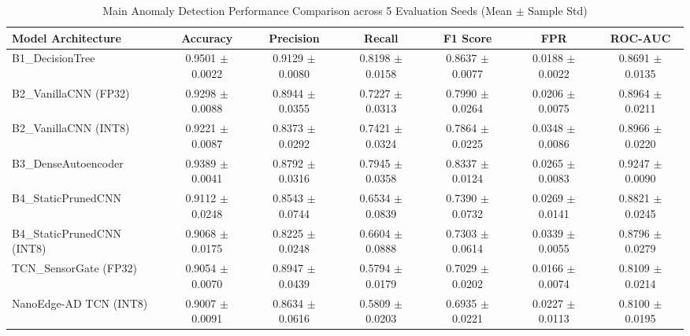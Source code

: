 \begin{table}[t]
\centering
\caption{Main Anomaly Detection Performance Comparison across 5 Evaluation Seeds (Mean $\pm$ Sample Std)}
\label{tab:main_comparison}
\small
\begin{tabular}{lcccccc}
\toprule
\textbf{Model Architecture} & \textbf{Accuracy} & \textbf{Precision} & \textbf{Recall} & \textbf{F1 Score} & \textbf{FPR} & \textbf{ROC-AUC} \\
\midrule
B1\_DecisionTree & 0.9501 $\pm$ 0.0022 & 0.9129 $\pm$ 0.0080 & 0.8198 $\pm$ 0.0158 & 0.8637 $\pm$ 0.0077 & 0.0188 $\pm$ 0.0022 & 0.8691 $\pm$ 0.0135 \\
B2\_VanillaCNN (FP32) & 0.9298 $\pm$ 0.0088 & 0.8944 $\pm$ 0.0355 & 0.7227 $\pm$ 0.0313 & 0.7990 $\pm$ 0.0264 & 0.0206 $\pm$ 0.0075 & 0.8964 $\pm$ 0.0211 \\
B2\_VanillaCNN (INT8) & 0.9221 $\pm$ 0.0087 & 0.8373 $\pm$ 0.0292 & 0.7421 $\pm$ 0.0324 & 0.7864 $\pm$ 0.0225 & 0.0348 $\pm$ 0.0086 & 0.8966 $\pm$ 0.0220 \\
B3\_DenseAutoencoder & 0.9389 $\pm$ 0.0041 & 0.8792 $\pm$ 0.0316 & 0.7945 $\pm$ 0.0358 & 0.8337 $\pm$ 0.0124 & 0.0265 $\pm$ 0.0083 & 0.9247 $\pm$ 0.0090 \\
B4\_StaticPrunedCNN & 0.9112 $\pm$ 0.0248 & 0.8543 $\pm$ 0.0744 & 0.6534 $\pm$ 0.0839 & 0.7390 $\pm$ 0.0732 & 0.0269 $\pm$ 0.0141 & 0.8821 $\pm$ 0.0245 \\
B4\_StaticPrunedCNN (INT8) & 0.9068 $\pm$ 0.0175 & 0.8225 $\pm$ 0.0248 & 0.6604 $\pm$ 0.0888 & 0.7303 $\pm$ 0.0614 & 0.0339 $\pm$ 0.0055 & 0.8796 $\pm$ 0.0279 \\
TCN\_SensorGate (FP32) & 0.9054 $\pm$ 0.0070 & 0.8947 $\pm$ 0.0439 & 0.5794 $\pm$ 0.0179 & 0.7029 $\pm$ 0.0202 & 0.0166 $\pm$ 0.0074 & 0.8109 $\pm$ 0.0214 \\
NanoEdge-AD TCN (INT8) & 0.9007 $\pm$ 0.0091 & 0.8634 $\pm$ 0.0616 & 0.5809 $\pm$ 0.0203 & 0.6935 $\pm$ 0.0221 & 0.0227 $\pm$ 0.0113 & 0.8100 $\pm$ 0.0195 \\
\bottomrule
\end{tabular}
\end{table}